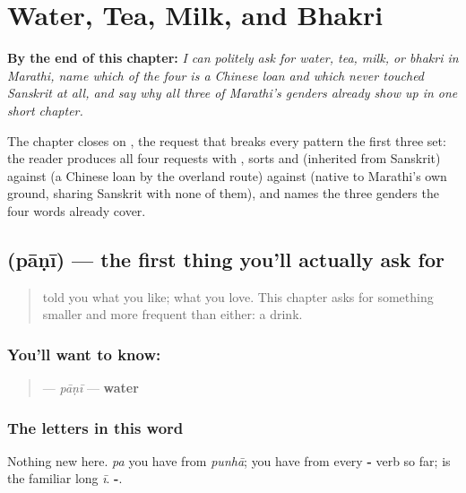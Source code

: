 
\chapter{Water, Tea, Milk, and Bhakri}
\label{ch:mr-request-food-drink}

\begin{chapteropening}
\textbf{By the end of this chapter:} \emph{I can politely ask for water, tea, milk, or bhakri in Marathi, name which of the four is a Chinese loan and which never touched Sanskrit at all, and say why all three of Marathi's genders already show up in one short chapter.}

The chapter closes on , the request that breaks every pattern the first three set: the reader produces all four requests with , sorts  and  (inherited from Sanskrit) against  (a Chinese loan by the overland route) against  (native to Marathi's own ground, sharing Sanskrit with none of them), and names the three genders the four words already cover.
\end{chapteropening}

\section[pāṇī]{ (pāṇī) — the first thing you'll actually ask for}

\label{lesson:MR-C10-paani}



\begin{quote}
\textbf{} told you what you like; \textbf{ } what you love. This chapter asks for something smaller and more frequent than either: a drink.
\end{quote}

\subsection*{You'll want to know: }
\begin{quote}
\textbf{} — \emph{pāṇī} — \textbf{water}
\end{quote}

\subsection*{The letters in this word}
Nothing new here. \textbf{} \emph{pa} you have from \emph{punhā}; \textbf{} you have from every \textbf{-} verb so far; \textbf{} is the familiar long \emph{ī}. \textbf{-}.


